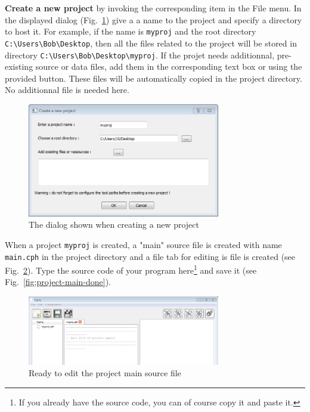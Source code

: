\medskip
\step \textbf{Create a new project} by invoking the corresponding item in the \textsf{File}
menu. In the displayed dialog (Fig.~\ref{fig:create-project}) give a a name to the project and
specify a directory to host it. For example, if the name is \texttt{myproj} and the root directory
\verb|C:\Users\Bob\Desktop|, then all the files related to the project will be stored in
directory \verb|C:\Users\Bob\Desktop\myproj|. If the projet needs additionnal, pre-existing
source or data files, add them in the corresponding text box or using the provided button. These
files will be automatically copied in the project directory. No additionnal file is needed here.

\begin{figure}[h]
  \centering
\includegraphics[width=0.75\textwidth]{figs/ide/create-project}
  \caption{The dialog shown when creating a new project}
  \label{fig:create-project}
\end{figure}

\step When a project \texttt{myproj} is created, a "main" source file is created with name
\texttt{main.cph} in the project directory and a file tab for editing is file is created (see
Fig.~\ref{fig:project-main}). Type the \caph source code of your program here\footnote{If you
  already have the source code, you can of course copy it and paste it.} and save it (see
Fig.~\ref{fig:project-main-done}). 

\begin{figure}[h]
  \centering
  \includegraphics[width=0.75\textwidth]{figs/ide/project-main}
  \caption{Ready to edit the project main source file}
  \label{fig:project-main}
\end{figure}

